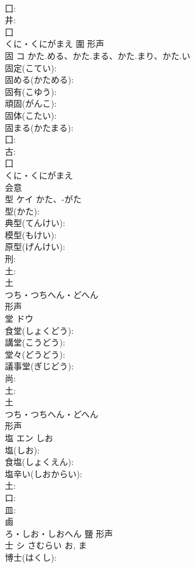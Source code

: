 \documentclass[8pt]{extreport}
\begin{document}
\begin{CJK}{UTF8}{min}
\\	囗: 
\\	井: 
\\	囗	
\\	くに・くにがまえ	圍	形声 
\\	固	コ	かた.める、かた.まる、かた.まり、かた.い		
\\	固定(こてい): 
\\	固める(かためる): 
\\	固有(こゆう): 
\\	頑固(がんこ): 
\\	固体(こたい): 
\\	固まる(かたまる): 
\\	囗: 
\\	古: 
\\	囗	
\\	くに・くにがまえ	
\\	会意 
\\	型	ケイ	かた、-がた		
\\	型(かた): 
\\	典型(てんけい): 
\\	模型(もけい): 
\\	原型(げんけい): 
\\	刑: 
\\	土: 
\\	土	
\\	つち・つちへん・どへん	
\\	形声 
\\	堂	ドウ			
\\	食堂(しょくどう): 
\\	講堂(こうどう): 
\\	堂々(どうどう): 
\\	議事堂(ぎじどう): 
\\	尚: 
\\	土: 
\\	土	
\\	つち・つちへん・どへん	
\\	形声 
\\	塩	エン	しお		
\\	塩(しお): 
\\	食塩(しょくえん): 
\\	塩辛い(しおからい): 
\\	土: 
\\	口: 
\\	皿: 
\\	鹵	
\\	ろ・しお・しおへん	鹽	形声 
\\	士	シ	さむらい	お, ま	
\\	博士(はくし): 

\end{CJK}
\end{document}
